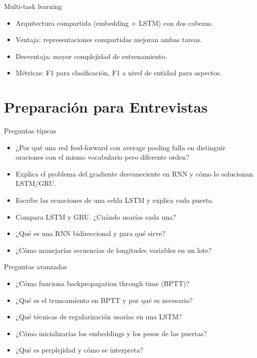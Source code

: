 \documentclass[aspectratio=169, 10pt, xcolor=table]{beamer}
\begin{document}
\begin{frame}{Multi-task learning}
    \begin{itemize}
        \item Arquitectura compartida (embedding + LSTM) con dos cabezas.
        \item Ventaja: representaciones compartidas mejoran ambas tareas.
        \item Desventaja: mayor complejidad de entrenamiento.
        \item Métricas: F1 para clasificación, F1 a nivel de entidad para aspectos.
    \end{itemize}
\end{frame}

\section{Preparación para Entrevistas}

\begin{frame}{Preguntas típicas}
    \begin{itemize}
        \item ¿Por qué una red feed-forward con average pooling falla en distinguir oraciones con el mismo vocabulario pero diferente orden?
        \item Explica el problema del gradiente desvaneciente en RNN y cómo lo solucionan LSTM/GRU.
        \item Escribe las ecuaciones de una celda LSTM y explica cada puerta.
        \item Compara LSTM y GRU. ¿Cuándo usarías cada una?
        \item ¿Qué es una RNN bidireccional y para qué sirve?
        \item ¿Cómo manejarías secuencias de longitudes variables en un lote?
    \end{itemize}
\end{frame}

\begin{frame}{Preguntas avanzadas}
    \begin{itemize}
        \item ¿Cómo funciona backpropagation through time (BPTT)?
        \item ¿Qué es el truncamiento en BPTT y por qué es necesario?
        \item ¿Qué técnicas de regularización usarías en una LSTM?
        \item ¿Cómo inicializarías los embeddings y los pesos de las puertas?
        \item ¿Qué es perplejidad y cómo se interpreta?
    \end{itemize}
\end{frame}
\end{document}

